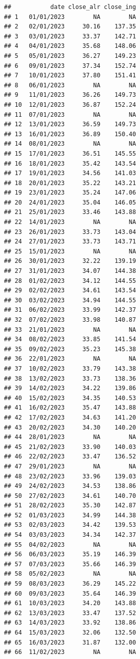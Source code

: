 \documentclass[
]{article}
\begin{document}
\begin{verbatim}
##           date close_alr close_ing
## 1   01/01/2023        NA        NA
## 2   02/01/2023     30.16    137.35
## 3   03/01/2023     33.37    142.71
## 4   04/01/2023     35.68    148.06
## 5   05/01/2023     36.27    149.23
## 6   09/01/2023     37.34    152.74
## 7   10/01/2023     37.80    151.41
## 8   06/01/2023        NA        NA
## 9   11/01/2023     36.26    149.73
## 10  12/01/2023     36.87    152.24
## 11  07/01/2023        NA        NA
## 12  13/01/2023     36.59    149.73
## 13  16/01/2023     36.89    150.40
## 14  08/01/2023        NA        NA
## 15  17/01/2023     36.51    145.55
## 16  18/01/2023     35.42    143.54
## 17  19/01/2023     34.56    141.03
## 18  20/01/2023     35.22    143.21
## 19  23/01/2023     35.24    147.06
## 20  24/01/2023     35.04    146.05
## 21  25/01/2023     33.46    143.88
## 22  14/01/2023        NA        NA
## 23  26/01/2023     33.73    143.04
## 24  27/01/2023     33.73    143.71
## 25  15/01/2023        NA        NA
## 26  30/01/2023     32.22    139.19
## 27  31/01/2023     34.07    144.38
## 28  01/02/2023     34.12    144.55
## 29  02/02/2023     34.61    143.54
## 30  03/02/2023     34.94    144.55
## 31  06/02/2023     33.99    142.37
## 32  07/02/2023     33.98    140.87
## 33  21/01/2023        NA        NA
## 34  08/02/2023     33.85    141.54
## 35  09/02/2023     35.23    145.38
## 36  22/01/2023        NA        NA
## 37  10/02/2023     33.79    143.38
## 38  13/02/2023     33.73    138.36
## 39  14/02/2023     34.22    139.86
## 40  15/02/2023     34.35    140.53
## 41  16/02/2023     35.47    143.88
## 42  17/02/2023     34.63    141.20
## 43  20/02/2023     34.30    140.20
## 44  28/01/2023        NA        NA
## 45  21/02/2023     33.90    140.03
## 46  22/02/2023     33.47    136.52
## 47  29/01/2023        NA        NA
## 48  23/02/2023     33.96    139.03
## 49  24/02/2023     34.53    138.86
## 50  27/02/2023     34.61    140.70
## 51  28/02/2023     35.30    142.87
## 52  01/03/2023     34.99    144.38
## 53  02/03/2023     34.42    139.53
## 54  03/03/2023     34.34    142.37
## 55  04/02/2023        NA        NA
## 56  06/03/2023     35.19    146.39
## 57  07/03/2023     35.66    146.39
## 58  05/02/2023        NA        NA
## 59  08/03/2023     36.29    145.22
## 60  09/03/2023     35.64    146.39
## 61  10/03/2023     34.20    143.88
## 62  13/03/2023     33.47    137.52
## 63  14/03/2023     33.92    138.86
## 64  15/03/2023     32.06    132.50
## 65  16/03/2023     31.87    132.00
## 66  11/02/2023        NA        NA

\end{verbatim}
\end{document}
